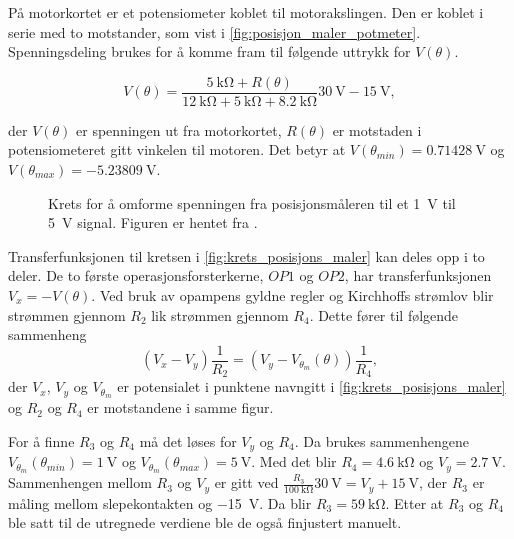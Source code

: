 På motorkortet er et potensiometer koblet til motorakslingen. Den er koblet i serie med to motstander, som vist i \autoref{fig:posisjon_maler_potmeter}. Spenningsdeling brukes for å komme fram til følgende uttrykk for $V(\theta)$.

\begin{equation}
    \label{eq:V_av_theta}
    V(\theta) = \frac{\SI{5}{\kilo\ohm} + R(\theta)}{\SI{12}{\kilo\ohm} + \SI{5}{\kilo\ohm} + \SI{8.2}{\kilo\ohm}} \SI{30}{\volt} - \SI{15}{\volt},
\end{equation}

der $V(\theta)$ er spenningen ut fra motorkortet, $R(\theta)$ er motstaden i potensiometeret gitt vinkelen til motoren. Det betyr at $V(\theta_{min}) = \SI{0.71428}{\volt}$ og $V(\theta_{max}) =\SI{-5.23809}{\volt}$. 

\begin{figure}[h]
    \centering
    
    \caption{Krets for å omforme spenningen fra posisjonsmåleren til et \SI{1}{\volt} til \SI{5}{\volt} signal. Figuren er hentet fra \cite{AnalogMotorlabbOppgaver}.}
    \label{fig:krets_posisjons_maler}
\end{figure}

Transferfunksjonen til kretsen i \autoref{fig:krets_posisjons_maler} kan deles opp i to deler. De to første operasjonsforsterkerne, $OP1$ og $OP2$, har transferfunksjonen $V_x = -V(\theta)$. Ved bruk av opampens gyldne regler og Kirchhoffs strømlov blir strømmen gjennom $R_2$ lik strømmen gjennom $R_4$. Dette fører til følgende sammenheng
\begin{equation}
    \label{eq:posisjonmåler_skalering}
    (V_x - V_y) \frac{1}{R_2} = (V_y - V_{\theta_m}(\theta)) \frac{1}{R_4},
\end{equation}
der $V_x$, $V_y$ og $V_{\theta_m}$ er potensialet i punktene navngitt i \autoref{fig:krets_posisjons_maler} og $R_2$ og $R_4$ er motstandene i samme figur.


For å finne $R_3$ og $R_4$ må det løses for $V_y$ og $R_4$. Da brukes sammenhengene $V_{\theta_m}(\theta_{min}) = \SI{1}{\volt}$ og $V_{\theta_m}(\theta_{max}) = \SI{5}{\volt}$. Med det blir $R_4 = \SI{4.6}{\kilo\ohm}$ og 
$V_y = \SI{2.7}{\volt}$. Sammenhengen mellom $R_3$ og $V_y$ er gitt ved $\frac{R_3}{\SI{100}{\kilo\ohm}} \SI{30}{\volt} = V_y + \SI{15}{\volt}$, der $R_3$ er måling mellom slepekontakten og \SI{-15}{\volt}. Da blir $R_3 = \SI{59}{\kilo\ohm}$. Etter at $R_3$ og $R_4$ ble satt til de utregnede verdiene ble de også finjustert manuelt.

